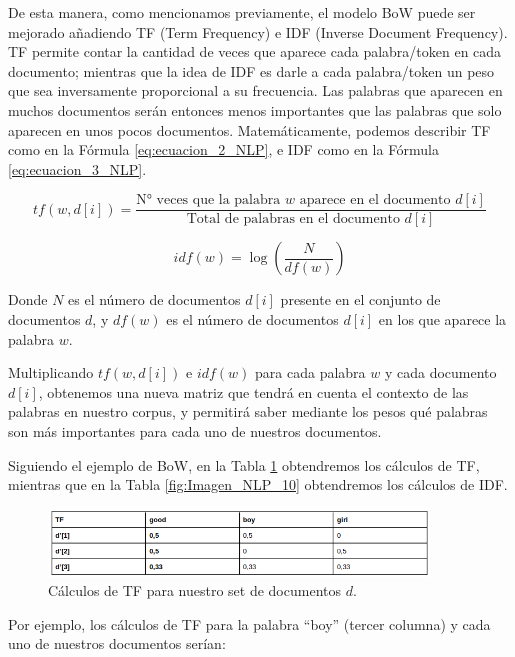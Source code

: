 \documentclass[12pt,a4paper]{article}
\begin{document}
\begin{sloppypar}
De esta manera, como mencionamos previamente, el modelo BoW puede ser mejorado añadiendo TF (Term Frequency) e IDF (Inverse Document Frequency). TF permite contar la cantidad de veces que aparece cada palabra/token en cada documento; mientras que la idea de IDF es darle a cada palabra/token un peso que sea inversamente proporcional a su frecuencia. Las palabras que aparecen en muchos documentos serán entonces menos importantes que las palabras que solo aparecen en unos pocos documentos\cite{apunte_uba}. Matemáticamente, podemos describir TF como en la Fórmula \ref{eq:ecuacion_2_NLP}, e IDF como en la Fórmula \ref{eq:ecuacion_3_NLP}.   

\begin{equation}\label{eq:ecuacion_2_NLP}
tf (w, d[i]) = \frac{\text{N° veces que la palabra $w$ aparece en el documento } d[i]} {{\text{Total de palabras en el documento } d[i]}}
\end{equation}

\begin{equation}\label{eq:ecuacion_3_NLP}
idf(w) = \log{(\frac{N}{df(w)})}
\end{equation}

Donde $N$ es el número de documentos $d[i]$ presente en el conjunto de documentos $d$, y $df(w)$ es el número de documentos $d[i]$ en los que aparece la palabra $w$.

Multiplicando $tf(w,d[i])$ e $idf(w)$ para cada palabra $w$ y cada documento $d[i]$, obtenemos una nueva matriz que tendrá en cuenta el contexto de las palabras en nuestro corpus, y permitirá saber mediante los pesos qué palabras son más importantes para cada uno de nuestros documentos.

Siguiendo el ejemplo de BoW, en la Tabla \ref{fig:Imagen_NLP_9} obtendremos los cálculos de TF, mientras que en la Tabla \ref{fig:Imagen_NLP_10} obtendremos los cálculos de IDF.

\begin{figure}[H]    
 \centering
 \includegraphics[width=0.9\textwidth]{images/NLP/9.png}
 \caption{Cálculos de TF para nuestro set de documentos $d$\cite{NLP_2}.}
 \label{fig:Imagen_NLP_9}
\end{figure}

Por ejemplo, los cálculos de TF para la palabra “boy” (tercer columna) y cada uno de nuestros documentos serían:


\end{sloppypar}
\end{document}
